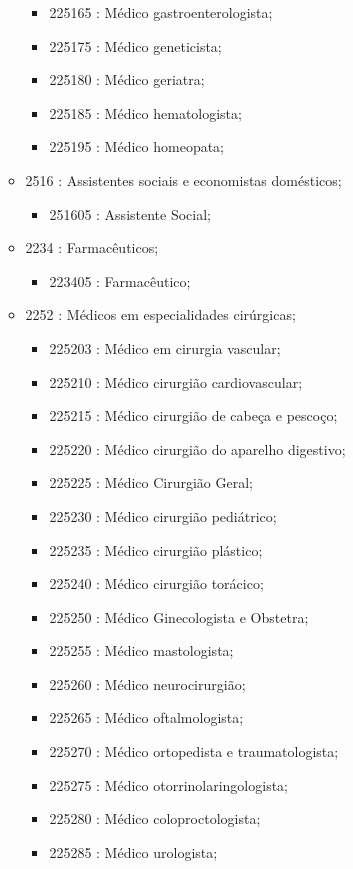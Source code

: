 \begin{itemize}
\begin{itemize}
\begin{itemize}
      \item 225165 : Médico gastroenterologista;
      \item 225175 : Médico geneticista;
      \item 225180 : Médico geriatra;
      \item 225185 : Médico hematologista;
      \item 225195 : Médico homeopata;
    \end{itemize}
    \item 2516 : Assistentes sociais e economistas domésticos;
    \begin{itemize}
      \item 251605 : Assistente Social;
    \end{itemize}
    \item 2234 : Farmacêuticos;
    \begin{itemize}
      \item 223405 : Farmacêutico;
    \end{itemize}
    \item 2252 : Médicos em especialidades cirúrgicas;
    \begin{itemize}
      \item 225203 : Médico em cirurgia vascular;
      \item 225210 : Médico cirurgião cardiovascular;
      \item 225215 : Médico cirurgião de cabeça e pescoço;
      \item 225220 : Médico cirurgião do aparelho digestivo;
      \item 225225 : Médico Cirurgião Geral;
      \item 225230 : Médico cirurgião pediátrico;
      \item 225235 : Médico cirurgião plástico;
      \item 225240 : Médico cirurgião torácico;
      \item 225250 : Médico Ginecologista e Obstetra;
      \item 225255 : Médico mastologista;
      \item 225260 : Médico neurocirurgião;
      \item 225265 : Médico oftalmologista;
      \item 225270 : Médico ortopedista e traumatologista;
      \item 225275 : Médico otorrinolaringologista;
      \item 225280 : Médico coloproctologista;
      \item 225285 : Médico urologista;

\end{itemize}
\end{itemize}
\end{itemize}
